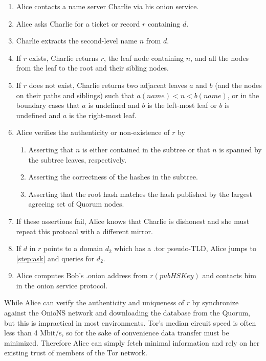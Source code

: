 \documentclass[USenglish,oneside,twocolumn]{article}
\begin{document}
\begin{enumerate}
	\item Alice contacts a name server Charlie via his onion service.
	\item \label{step:ask} Alice asks Charlie for a ticket or record $ r $ containing $ d $.
	\item Charlie extracts the second-level name $ n $ from $ d $.
	\item If $ r $ exists, Charlie returns $ r $, the leaf node containing $ n $, and all the nodes from the leaf to the root and their sibling nodes.
	\item If $ r $ does not exist, Charlie returns two adjacent leaves $ a $ and $ b $ (and the nodes on their paths and siblings) such that $ a(\mathit{name}) < n < b(\mathit{name}) $, or in the boundary cases that $ a $ is undefined and $ b $ is the left-most leaf or $ b $ is undefined and $ a $ is the right-most leaf.
	\item Alice verifies the authenticity or non-existence of $ r $ by 
		\begin{enumerate}
			\item Asserting that $ n $ is either contained in the subtree or that $ n $ is spanned by the subtree leaves, respectively.
			\item Asserting the correctness of the hashes in the subtree.
			\item Asserting that the root hash matches the hash published by the largest agreeing set of Quorum nodes. %
		\end{enumerate}
	\item If these assertions fail, Alice knows that Charlie is dishonest and she must repeat this protocol with a different mirror.
	\item If $ d $ in $ r $ points to a domain $ d_{2} $ which has a .tor pseudo-TLD, Alice jumps to \ref{step:ask} and queries for $ d_{2} $.
	\item Alice computes Bob's .onion address from $ r(\mathit{pubHSKey}) $ and contacts him in the onion service protocol.
\end{enumerate}

While Alice can verify the authenticity and uniqueness of $ r $ by synchronize against the OnioNS network and downloading the database from the Quorum, but this is impractical in most environments. Tor's median circuit speed is often less than 4 Mbit/s, \cite{TorMetrics} so for the sake of convenience data transfer must be minimized. Therefore Alice can simply fetch minimal information and rely on her existing trust of members of the Tor network.
\end{document}
